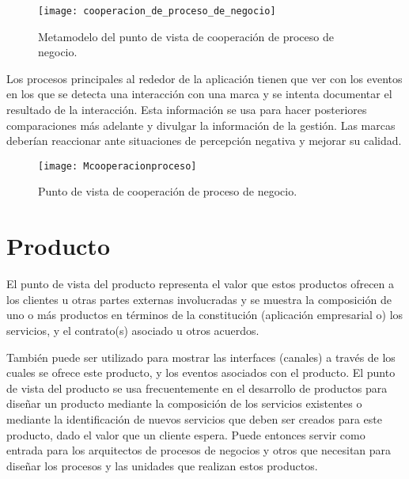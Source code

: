\begin{figure}[h]
\centering
\texttt{[image: cooperacion\_de\_proceso\_de\_negocio]}
\caption{Metamodelo del punto de vista de cooperación de proceso de negocio.}
\end{figure}

Los procesos principales al rededor de la aplicación tienen que ver con los eventos en los que se detecta una interacción con una marca y se intenta documentar el resultado de la interacción. Esta información se usa para hacer posteriores comparaciones más adelante y divulgar la información de la gestión. Las marcas deberían reaccionar ante situaciones de percepción negativa y mejorar su calidad.

\begin{figure}[H]
\centering
\texttt{[image: Mcooperacionproceso]}
\caption{Punto de vista de cooperación de proceso de negocio.}
\end{figure}

\section{Producto}


El punto de vista del producto representa el valor que estos productos ofrecen a los clientes u otras partes externas involucradas y se muestra la composición de uno o más productos en términos de la constitución (aplicación empresarial o) los servicios, y el contrato(s) asociado u otros acuerdos. 

También puede ser utilizado para mostrar las interfaces (canales) a través de los cuales se ofrece este producto, y los eventos asociados con el producto. El punto de vista del producto se usa frecuentemente en el desarrollo de productos para diseñar un producto mediante la composición de los servicios existentes o mediante la identificación de nuevos servicios que deben ser creados para este producto, dado el valor que un cliente espera. Puede entonces servir como entrada para los arquitectos de procesos de negocios y otros que necesitan para diseñar los procesos y las unidades que realizan estos productos.

